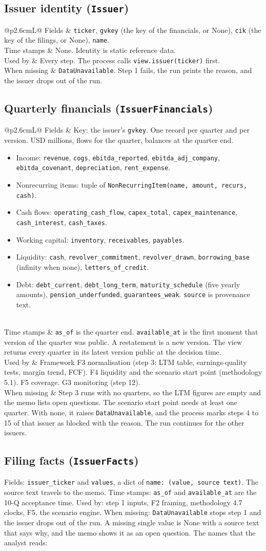 \documentclass[11pt,a4paper]{article}
\makeatletter
\newcommand{\code}[1]{\texttt{\small #1}}
\newcommand{\kind}[5]{%
\subsection{#1}
\noindent\begin{tabularx}{\linewidth}{@{}p{2.6cm}L@{}}
\toprule
Fields & #2\\\midrule
Time stamps & #3\\\midrule
Used by & #4\\\midrule
When missing & #5\\\bottomrule
\end{tabularx}}
\makeatother
\begin{document}
\kind{Issuer identity (\code{Issuer})}
{\code{ticker}, \code{gvkey} (the key of the financials, or None), \code{cik} (the key of the filings, or None),
\code{name}.}
{None. Identity is static reference data.}
{Every step. The process calls \code{view.issuer(ticker)} first.}
{\code{DataUnavailable}. Step 1 fails, the run prints the reason, and the issuer drops out of the run.}

\kind{Quarterly financials (\code{IssuerFinancials})}
{Key: the issuer's \code{gvkey}. One record per quarter and per version. USD millions, flows for the quarter,
balances at the quarter end.
\begin{itemize}
\item Income: \code{revenue}, \code{cogs}, \code{ebitda\_reported}, \code{ebitda\_adj\_company}, \code{ebitda\_covenant},
  \code{depreciation}, \code{rent\_expense}.
\item Nonrecurring items: tuple of \code{NonRecurringItem(name, amount, recurs, cash)}.
\item Cash flows: \code{operating\_cash\_flow}, \code{capex\_total}, \code{capex\_maintenance}, \code{cash\_interest},
  \code{cash\_taxes}.
\item Working capital: \code{inventory}, \code{receivables}, \code{payables}.
\item Liquidity: \code{cash}, \code{revolver\_commitment}, \code{revolver\_drawn}, \code{borrowing\_base} (infinity when
  none), \code{letters\_of\_credit}.
\item Debt: \code{debt\_current}, \code{debt\_long\_term}, \code{maturity\_schedule} (five yearly amounts),
  \code{pension\_underfunded}, \code{guarantees\_weak}. \code{source} is provenance text.
\end{itemize}}
{\code{as\_of} is the quarter end. \code{available\_at} is the first moment that version of the quarter was public.
A restatement is a new version. The view returns every quarter in its latest version public at the decision time.}
{Framework F3 normalisation (step 3: LTM table, earnings-quality tests, margin trend, FCF). F4 liquidity and the
scenario start point (methodology 5.1). F5 coverage. G3 monitoring (step 12).}
{Step 3 runs with no quarters, so the LTM figures are empty and the memo lists open questions. The scenario start
point needs at least one quarter. With none, it raises \code{DataUnavailable}, and the process marks steps 4 to 15 of that issuer as blocked with the reason. The run continues for the other issuers.}

\subsection{Filing facts (\code{IssuerFacts})}
\noindent Fields: \code{issuer\_ticker} and \code{values}, a dict of \code{name: (value, source text)}. The source text
travels to the memo. Time stamps: \code{as\_of} and \code{available\_at} are the 10-Q acceptance time. Used by: step 1
inputs, F2 framing, methodology 4.7 clocks, F5, the scenario engine. When missing: \code{DataUnavailable} stops step 1
and the issuer drops out of the run. A missing single value is None with a source text that says why, and the memo
shows it as an open question. The names that the analyst reads:
\end{document}
